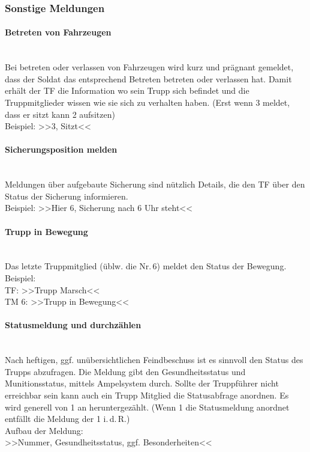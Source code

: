 \subsubsection{Sonstige Meldungen}
	\paragraph*{Betreten von Fahrzeugen}\hfil\\
	\label{para:fahrzeug-betreten}
	Bei betreten oder verlassen von Fahrzeugen wird kurz und prägnant gemeldet, dass der Soldat das entsprechend Betreten betreten oder verlassen hat. Damit erhält der TF die Information wo sein Trupp sich befindet und die Truppmitglieder wissen wie sie sich zu verhalten haben. (Erst wenn 3 meldet, dass er sitzt kann 2 aufsitzen)\\
	Beispiel: >>3, Sitzt<<

	\paragraph*{Sicherungsposition melden}\hfil\\
	Meldungen über aufgebaute Sicherung sind nützlich Details, die den TF über den Status der Sicherung informieren. \\
	Beispiel: >>Hier 6, Sicherung nach 6 Uhr steht<<

	\paragraph*{Trupp in Bewegung}\hfil\\
	Das letzte Truppmitglied (üblw. die Nr.\,6) meldet den Status der Bewegung.\\
	Beispiel: \\
	TF: >>Trupp Marsch<<\\
	TM 6: >>Trupp in Bewegung<<
	
	\paragraph*{Statusmeldung und durchzählen}\hfil\\
	\label{sec:Status}
	Nach heftigen, ggf. unübersichtlichen Feindbeschuss ist es sinnvoll den Status des Trupps abzufragen. Die Meldung gibt den Gesundheitsstatus und Munitionsstatus, mittels Ampelsystem durch. Sollte der Truppführer nicht erreichbar sein kann auch ein Trupp Mitglied die Statusabfrage anordnen.
	Es wird generell von 1 an heruntergezählt. (Wenn 1 die Statusmeldung anordnet entfällt die Meldung der 1 i.\,d.\,R.)  \\
	Aufbau der Meldung:\\
	>>Nummer, Gesundheitsstatus, ggf. Besonderheiten<<\\
	
